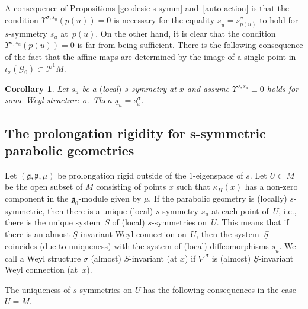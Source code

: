 \documentclass[10pt,a4paper]{amsart}
\newcommand{\si}{\sigma}
\newcommand{\un}{\underline}
\newcommand{\ba}{\mathcal{G}}
\newcommand{\fg}{\mathfrak g}
\newcommand{\fp}{\mathfrak p}
\newcommand{\U}{\Upsilon}
\numberwithin{equation}{section}
\newtheorem{Corollary}[Theorem]{Corollary}
\begin{document}
A consequence of Propositions \ref{geodesic-s-symm} and~\ref{auto-action} is that the condition $\U^{\si,s_u}(p(u))=0$ is necessary for the equality $\un s_u=s^\si_{p(u)}$ to hold for $s$-symmetry $s_u$ at~$p(u)$. On the other hand, it is clear that the condition $\U^{\si,s_u}(p(u))=0$ is far from being suf\/f\/icient. There is the following consequence of the fact that the af\/f\/ine maps are determined by the image of a single point in $\iota_\si(\ba_0)\subset \mathcal{P}^1M$.

\begin{Corollary}\label{c3.3}
Let $s_u$ be a $($local$)$ $s$-symmetry at $x$ and assume $\U^{\si,s_u}\equiv 0$ holds for some Weyl structu\-re~$\si$. Then $\un s_u=s_x^{\si}$.
\end{Corollary}

\subsection[The prolongation rigidity for $s$-symmetric parabolic geometries]{The prolongation rigidity for $\boldsymbol{s}$-symmetric parabolic geometries}\label{sec4.3}

Let $(\fg,\fp,\mu)$ be prolongation rigid outside of the $1$-eigenspace of $s$. Let $U\subset M$ be the open subset of $M$ consisting of points $x$ such that $\kappa_H(x)$ has a non-zero component in the $\fg_0$-module given by $\mu$. If the parabolic geometry is (locally) $s$-symmetric, then there is a unique (local) $s$-symmetry $s_u$ at each point of~$U$, i.e., there is the unique system~$S$ of (local) $s$-symmetries on~$U$. This means that if there is an almost $\un S$-invariant Weyl connection on~$U$, then the system~$\un S$ coincides (due to uniqueness) with the system of (local) dif\/feomorphisms $\un s_u$. We call a Weyl structure $\si$ (almost) $S$-invariant (at $x$) if $\nabla^\si$ is (almost) $\un S$-invariant Weyl connection (at~$x$).

The uniqueness of $s$-symmetries on $U$ has the following consequences in the case $U=M$.
\end{document}
